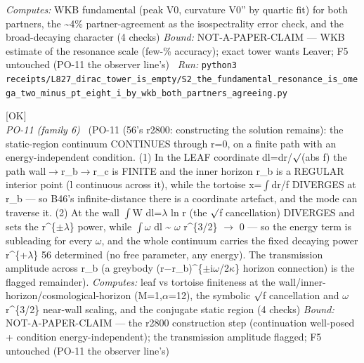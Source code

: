 \begin{description}
\emph{Computes:} WKB fundamental (peak V0, curvature V0'' by quartic fit) for both partners, the \textasciitilde{}4\% partner-agreement as the isospectrality error check, and the broad-decaying character (4 checks)
 \emph{Bound:} NOT-A-PAPER-CLAIM --- WKB estimate of the resonance scale (few-\% accuracy); exact tower wants Leaver; F5 untouched (PO-11 the observer line's)
\ \emph{Run:} \texttt{python3 receipts/L827\_dirac\_tower\_is\_empty/S2\_the\_fundamental\_resonance\_is\_omega\_two\_minus\_pt\_eight\_i\_by\_wkb\_both\_partners\_agreeing.py}
\item[\label{rcpt:S1_the_continuum_continues_through_r0_on_a_finite_leaf_path_with_an_energy_independent_wall_condition}\texttt{S1\_the\_continuum\_continues\_through\_r0\_on\_a\_finite\_leaf\_path\_with\_an\_energy\_independent\_wall\_condition}]\hfill\textsf{[OK]}\\
\textit{PO-11 (family 6)} \ (PO-11 (56's r2800: constructing the solution remains): the static-region continuum CONTINUES through r=0, on a finite path with an energy-independent condition. (1) In the LEAF coordinate dl=dr/\ensuremath{\surd}(abs f) the path wall\ensuremath{\to}r\_b\ensuremath{\to}r\_c is FINITE and the inner horizon r\_b is a REGULAR interior point (l continuous across it), while the tortoise x=\ensuremath{\int}dr/f DIVERGES at r\_b --- so B46's infinite-distance there is a coordinate artefact, and the mode can traverse it. (2) At the wall \ensuremath{\int}W dl=\ensuremath{\lambda} ln r (the \ensuremath{\surd}f cancellation) DIVERGES and sets the r\textasciicircum{}\{\ensuremath{\pm}\ensuremath{\lambda}\} power, while \ensuremath{\int}\ensuremath{\omega} dl \textasciitilde{} \ensuremath{\omega} r\textasciicircum{}\{3/2\} \ensuremath{\to} 0 --- so the energy term is subleading for every \ensuremath{\omega}, and the whole continuum carries the fixed decaying power r\textasciicircum{}\{+\ensuremath{\lambda}\} 56 determined (no free parameter, any energy). The transmission amplitude across r\_b (a greybody (r\ensuremath{-}r\_b)\textasciicircum{}\{\ensuremath{\pm}i\ensuremath{\omega}/2\ensuremath{\kappa}\} horizon connection) is the flagged remainder). 
\emph{Computes:} leaf vs tortoise finiteness at the wall/inner-horizon/cosmological-horizon (M=1,\ensuremath{\alpha}=12), the symbolic \ensuremath{\surd}f cancellation and \ensuremath{\omega} r\textasciicircum{}\{3/2\} near-wall scaling, and the conjugate static region (4 checks)
 \emph{Bound:} NOT-A-PAPER-CLAIM --- the r2800 construction step (continuation well-posed + condition energy-independent); the transmission amplitude flagged; F5 untouched (PO-11 the observer line's)

\end{description}
